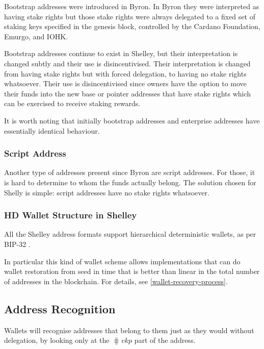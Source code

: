 \documentclass[11pt,a4paper]{article}
\begin{document}
Bootstrap addresses were introduced in Byron. In Byron they were
interpreted as having stake rights but those stake rights were always
delegated to a fixed set of staking keys specified in the genesis block,
controlled by the Cardano Foundation, Emurgo, and IOHK.

Bootstrap addresses continue to exist in Shelley, but their
interpretation is changed subtly and their use is disincentivised.
Their interpretation is changed from having stake rights but with
forced delegation, to having no stake rights whatsoever. Their use is
disincentivised since owners have the option to move their funds into
the new base or pointer addresses that have stake rights which can be
exercised to receive staking rewards.

It is worth noting that initially bootstrap addresses and enterprise
addresses have essentially identical behaviour.

\subsubsection{Script Address}
\label{script-address}

Another type of addresses present since Byron are script addresses. For
those, it is hard to determine to whom the funds actually belong. The
solution chosen for Shelly is simple: script addresses have no stake
rights whatsoever.

\subsubsection{HD Wallet Structure in Shelley}
\label{hd-wallet-structure-in-shelley}

All the Shelley address formats support hierarchical deterministic
wallets, as per BIP-32 \citep{bip32}.

In particular this kind of wallet scheme allows implementations that can
do wallet restoration from seed in time that is better than linear in
the total number of addresses in the blockchain. For details, see
\cref{wallet-recovery-process}.

\subsection{Address Recognition}
\label{address-recognition-1}

Wallets will recognise addresses that belong to them just as they would
without delegation, by looking only at the \(\hash{vkp}\) part
of the address.
\end{document}
